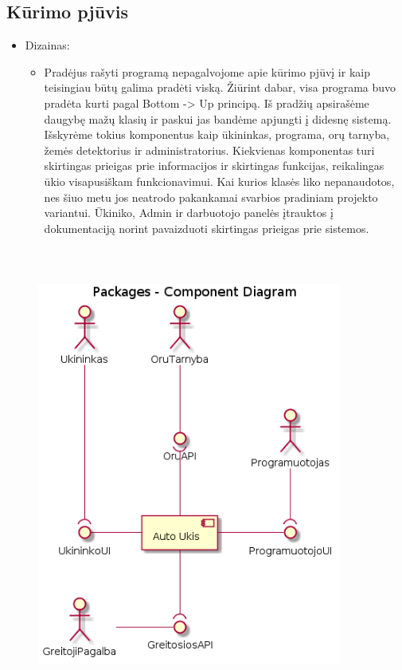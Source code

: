 \documentclass[oneside]{VUMIFPSkursinis}
\begin{document}
\subsection{Kūrimo pjūvis}
\begin{itemize}
\item Dizainas: 
		\begin{itemize}
			\item Pradėjus rašyti programą nepagalvojome apie kūrimo pjūvį ir kaip teisingiau būtų galima pradėti viską. Žiūrint dabar, visa programa buvo pradėta kurti pagal Bottom -> Up principą. Iš pradžių apsirašėme daugybę mažų klasių ir paskui jas bandėme apjungti į didesnę sistemą. Išskyrėme tokius komponentus kaip ūkininkas, programa, orų tarnyba, žemės detektorius ir administratorius. Kiekvienas komponentas turi skirtingas prieigas prie informacijos ir skirtingas funkcijas, reikalingas ūkio visapusiškam funkcionavimui. Kai kurios klasės liko nepanaudotos, nes šiuo metu jos neatrodo pakankamai svarbios pradiniam projekto variantui. Ūkiniko, Admin ir darbuotojo panelės įtrauktos į dokumentaciją norint pavaizduoti skirtingas prieigas prie sistemos.
		\end{itemize}
		\end{itemize}
\begin{figure}[H]
\centering	
\includegraphics[width=10cm,height=15cm,keepaspectratio]{l0.png}	
\caption{}
\label{fig:l0}
\end{figure}
\end{document}

